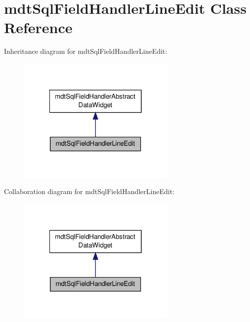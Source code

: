 \hypertarget{classmdt_sql_field_handler_line_edit}{\section{mdt\-Sql\-Field\-Handler\-Line\-Edit Class Reference}
\label{classmdt_sql_field_handler_line_edit}
}


Inheritance diagram for mdt\-Sql\-Field\-Handler\-Line\-Edit\-:\nopagebreak
\begin{figure}[H]
\begin{center}
\leavevmode
\includegraphics[width=218pt]{classmdt_sql_field_handler_line_edit__inherit__graph}
\end{center}
\end{figure}


Collaboration diagram for mdt\-Sql\-Field\-Handler\-Line\-Edit\-:\nopagebreak
\begin{figure}[H]
\begin{center}
\leavevmode
\includegraphics[width=218pt]{classmdt_sql_field_handler_line_edit__coll__graph}
\end{center}
\end{figure}

